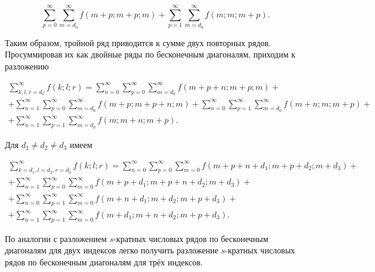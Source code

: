 $$\sum_{p=0}^\infty\sum_{m=d_0}^\infty f(m+p;m+p;m)+

\sum_{p=1}^\infty\sum_{m=d_0}^\infty f(m;m;m+p).$$



Таким образом, тройной ряд приводится к сумме двух повторных рядов. Просуммировав их как двойные ряды по бесконечным диагоналям, приходим к разложению

\begin{multline*}

\sum_{k,l,r=d_0}^\infty f(k;l;r)=

\sum_{n=0}^\infty\sum_{p=0}^\infty\sum_{m=d_0}^\infty f(m+p+n;m+p;m)+ \\+

\sum_{n=1}^\infty\sum_{p=0}^\infty\sum_{m=d_0}^\infty f(m+p;m+p+n;m)

+\sum_{n=0}^\infty\sum_{p=1}^\infty\sum_{m=d_0}^\infty f(m+n;m;m+p)+ \\+

\sum_{n=1}^\infty\sum_{p=1}^\infty\sum_{m=d_0}^\infty f(m;m+n;m+p).

\end{multline*}



Для $d_1\ne d_2\ne d_3$ имеем

\begin{multline*}

\sum_{k=d_1,l=d_2,r=d_3}^\infty f(k;l;r)=

\sum_{n=0}^\infty\sum_{p=0}^\infty\sum_{m=0}^\infty f(m+p+n+d_1;m+p+d_2;m+d_3)+

\\

+\sum_{n=1}^\infty\sum_{p=0}^\infty\sum_{m=0}^\infty f(m+p+d_1;m+p+n+d_2;m+d_3)+

\\

+\sum_{n=0}^\infty\sum_{p=1}^\infty\sum_{m=0}^\infty f(m+n+d_1;m+d_2;m+p+d_3)+

\\

+\sum_{n=1}^\infty\sum_{p=1}^\infty\sum_{m=0}^\infty f(m+d_1;m+n+d_2;m+p+d_3).

\end{multline*}



По аналогии с разложением $s$-кратных числовых рядов по бесконечным диагоналям для двух индексов легко получить разложение $s$-кратных числовых рядов по бесконечным диагоналям для трёх индексов.



